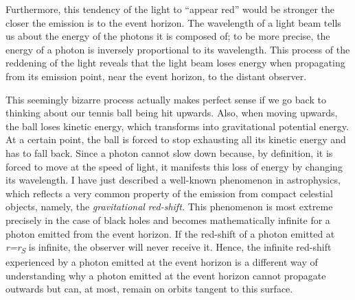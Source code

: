 Furthermore, this tendency of the light to ``appear red'' would be stronger the closer
the emission is to the event horizon. The wavelength of a light beam tells us about the
energy of the photons it is composed of; to be more precise, the
energy of a photon is inversely proportional to its
wavelength. This process of the reddening of the light reveals that the light beam loses
energy when propagating from its emission point, near the event horizon, to the distant
observer.

This seemingly bizarre process actually makes perfect sense if we go back to thinking
about our tennis ball being hit upwards. Also, when moving upwards, the ball loses
kinetic energy, which transforms into gravitational potential energy. At a certain
point, the ball is forced to stop exhausting all its kinetic energy and has to fall
back. Since a photon cannot slow down because, by definition, it is
forced to move at the speed of light, it manifests this loss of energy by changing its
wavelength. I have just described a well-known phenomenon in astrophysics, which
reflects a very common property of the emission from compact celestial objects, namely,
the \emph{gravitational} \emph{red-shift}\emph{.}
This phenomenon is most extreme precisely in the case of black holes and becomes
mathematically infinite for a photon emitted from the event horizon. If the red-shift of
a photon emitted at \emph{r=r\textsubscript{S}} is infinite, the observer will never
receive it. Hence, the infinite red-shift experienced by a photon emitted at the event
horizon is a different way of understanding why a photon emitted at the event horizon
cannot propagate outwards but can, at most, remain on orbits tangent
to this surface.

